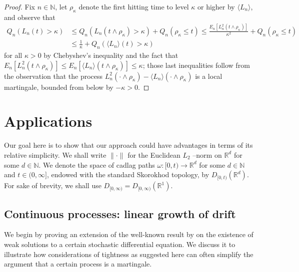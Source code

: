 \begin{proof}
Fix $n \in \mathbb{N}$, let $\rho_{\kappa}$ denote the first hitting time to
level $\kappa$ or higher by $\langle L_n \rangle$, and observe that
\begin{align*}
Q_{n}\left( L_n(t) > \kappa\right) &\leq Q_{n}\left(L_n(t \wedge
\rho_{\kappa}) > \kappa\right) + Q_{n}\left( \rho_{\kappa} \leq t \right)
\leq \frac{E_{n}\left[L_n^2(t \wedge \rho_{\kappa})\right]}{\kappa^2} +
Q_{n}\left( \rho_{\kappa} \leq t \right) \\
&\leq \frac{1}{\kappa} + Q_{n}\left( \langle L_n\rangle (t) > \kappa\right)
\end{align*}
for all $\kappa>0$ by Chebyshev's inequality and the fact that $E_n[L_n^2(t
\wedge \rho_{\kappa})] \leq E_n[\langle L_n\rangle (t \wedge \rho_{\kappa})
] \leq \kappa$; those last inequalities follow from the observation that the process $L_n^2(\cdot \wedge \rho_{\kappa})
- \langle L_n\rangle (\cdot \wedge \rho_{\kappa})$ is a local martingale, bounded from below by $-\kappa>0$.
\end{proof}

\section{Applications}

\label{S ex}

Our goal here is to show that our approach could have advantages in terms of
its relative simplicity. We shall write $\|\cdot\|$ for the Euclidean $L_2$%
--norm on ${\mathbb{R}}^d$ for some $d \in \mathbb{N}$. We denote the space
of cadlag paths $\omega :[0,t )\rightarrow {\mathbb{R}}^{d}$ for some $d\in
\mathbb{N}$ and $t \in (0,\infty]$,
endowed with the standard Skorokhod topology, by $D_{[0,t )}({\mathbb{R}}^{d})$. For sake of brevity, we shall
use $D_{[0,\infty)} = D_{[0,\infty)}({\mathbb{R}}^1)$.

\subsection{Continuous processes: linear growth of drift}

We begin by proving an extension of the well-known result by %
\citet{Benes_1971} on the existence of weak solutions to a certain
stochastic differential equation. We discuss it to illustrate how
considerations of tightness as suggested here can often simplify the
argument that a certain process is a martingale.

